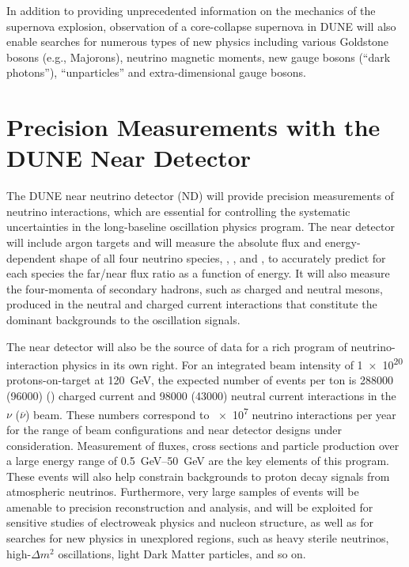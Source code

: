 In addition to providing unprecedented information on the mechanics of
the supernova explosion, observation of a core-collapse supernova in
DUNE will also enable searches for numerous types of new physics
including various Goldstone bosons (e.g., Majorons), neutrino magnetic
moments, new gauge bosons (``dark photons''), ``unparticles'' and
extra-dimensional gauge bosons.

%
%
\section{Precision Measurements with the DUNE Near Detector}

The DUNE near neutrino detector (ND) will provide precision measurements of
neutrino interactions, which are essential
for controlling the systematic uncertainties in the long-baseline
oscillation physics program.  The near detector %
will include argon targets and will measure the absolute flux and energy-dependent
shape of all four neutrino species, \numu, \anumu, \nue and \anue,
to accurately predict for each species the
far/near flux ratio as a function of energy.  It will also measure the
four-momenta of secondary hadrons, such as charged and neutral mesons,
produced in the neutral and charged current interactions that
constitute the dominant backgrounds to the oscillation signals.

The near detector will also be the source of data for a rich program of neutrino-interaction 
physics in its own right. For an integrated beam intensity of 
\num{1e20} %
protons-on-target at \SI{120}{GeV}, the expected number
of events per ton is 
 \num{288000} (\num{96000}) %
\numu (\anumu) charged current 
and \num{98000} (\num{43000})  neutral current interactions in the $\nu$ ($\overline\nu$) beam. These numbers correspond to
\num{e7}  neutrino interactions per year for the range of beam
configurations and near detector designs under consideration.
Measurement of fluxes, cross sections and particle production over a
large energy range of \SIrange{0.5}{50}{\GeV} are the key
elements of this program.  These events
will also help constrain backgrounds to proton decay signals from atmospheric neutrinos.
Furthermore, very large
samples of events will be amenable to precision reconstruction and
analysis, and will be exploited for sensitive studies of electroweak
physics and nucleon structure, as well as for searches for new physics
in unexplored regions, such as heavy sterile neutrinos, high-$\Delta m^2$
oscillations, light Dark Matter particles, and so on. 

